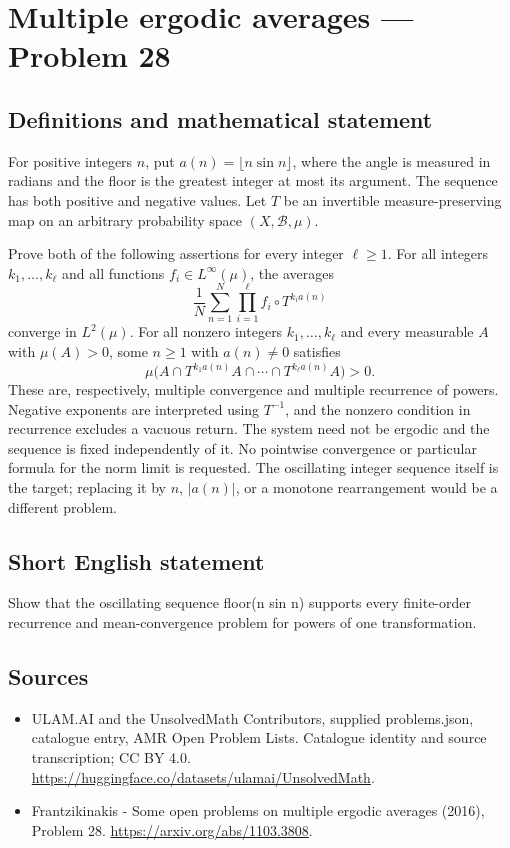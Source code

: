 \documentclass[11pt,a4paper]{article}
\begin{document}
\section*{Multiple ergodic averages — Problem 28}\label{statement}

\subsection{Definitions and mathematical statement}
For positive integers $n$, put $a(n)=\lfloor n\sin n\rfloor$,
where the angle is measured in radians and the floor
is the greatest integer at most its argument.
The sequence has both positive and negative values.
Let $T$ be an invertible measure-preserving map on
an arbitrary probability space $(X,\mathcal B,\mu)$.

Prove both of the following assertions for every
integer $\ell\ge1$. For all integers
$k_1,\ldots,k_\ell$ and all functions
$f_i\in L^\infty(\mu)$, the averages
\[
             \frac1N\sum_{n=1}^N\prod_{i=1}^\ell
                             f_i\circ T^{k_i a(n)}
\]
converge in $L^2(\mu)$. For all nonzero integers
$k_1,\ldots,k_\ell$ and every measurable $A$
with $\mu(A)>0$, some $n\ge1$ with $a(n)\ne0$
satisfies
\[
            \mu\bigl(A\cap T^{k_1a(n)}A\cap\cdots
                              \cap T^{k_\ell a(n)}A\bigr)>0.
\]
These are, respectively, multiple convergence and
multiple recurrence of powers. Negative exponents
are interpreted using $T^{-1}$, and the nonzero
condition in recurrence excludes a vacuous return.
The system need not be ergodic and the sequence
is fixed independently of it. No pointwise
convergence or particular formula for the norm
limit is requested. The oscillating integer
sequence itself is the target; replacing it by
$n$, $|a(n)|$, or a monotone rearrangement would
be a different problem.
\subsection{Short English statement}
Show that the oscillating sequence floor(n sin n) supports every finite-order recurrence and mean-convergence problem for powers of one transformation.
\subsection{Sources}
\begin{itemize}
\item[S1] ULAM.AI and the UnsolvedMath Contributors, supplied problems.json, catalogue entry, AMR Open Problem Lists. Catalogue identity and source transcription; CC BY 4.0.
\url{https://huggingface.co/datasets/ulamai/UnsolvedMath}.
\item[S2] Frantzikinakis - Some open problems on multiple ergodic averages (2016), Problem 28. 
\url{https://arxiv.org/abs/1103.3808}.
\end{itemize}
\end{document}
